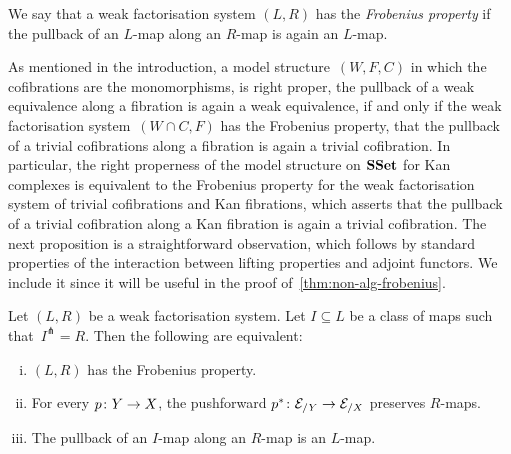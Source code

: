 \documentclass[reqno,10pt,a4paper,oneside,draft]{amsart}
\begin{document}
\begin{definition} We say that a weak factorisation system $(L, R)$ has the \emph{Frobenius property} if the pullback of an $L$-map along 
an $R$-map is again an $L$-map.
\end{definition} 

As mentioned in the introduction, a model structure~$(W, F, C)$ in which the cofibrations are the monomorphisms,
is right proper, \ie the pullback of a weak equivalence along a fibration is again a weak equivalence, 
if and only if the weak factorisation system~$(W \cap C, F)$ has the Frobenius property, \ie that the pullback of a trivial cofibrations along a fibration is again a trivial cofibration. In particular, the right properness of the model structure on $\mathbf{SSet}$ for Kan complexes is equivalent to the Frobenius property
for the weak factorisation system of trivial cofibrations and Kan fibrations, which asserts 
that the pullback of a trivial cofibration along a Kan fibration
is again a trivial cofibration. The next proposition is a straightforward observation, which follows by standard
properties of the interaction between lifting properties and adjoint functors. We include it since it will be useful
in the proof of~\cref{thm:non-alg-frobenius}.



\begin{proposition} 
\label{thm:frobenius-equivalence}
Let $(L, R)$ be a weak factorisation system. Let $I \subseteq L$ be a class of maps such that~$I^\pitchfork = R$. Then the following are equivalent:
\begin{enumerate}[(i)] 
\item $(L,R)$ has the Frobenius property. 
\item For every $p \colon Y \to X$, the pushforward $p^* \colon \mathcal{E}_{/Y} \to \mathcal{E}_{/X}$ preserves $R$-maps.
\item The pullback of an $I$-map along 
an $R$-map is an $L$-map.
\end{enumerate}
\end{proposition} 
\end{document}
